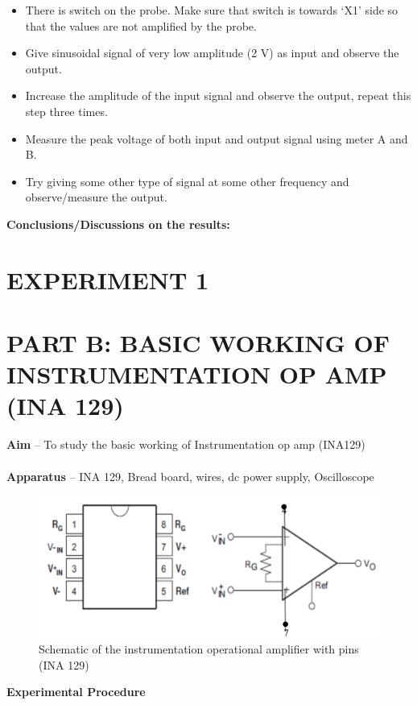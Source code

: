 \documentclass[9pt]{scrreprt}
\begin{document}
\begin{itemize}
\item There is switch on the probe. Make sure that switch is towards ‘X1’ side so that the values are not amplified by the probe.
\item Give sinusoidal signal of very low amplitude (2 V) as input and observe the output.
\item Increase the amplitude of the input signal and observe the output, repeat this step three times.
\item Measure the peak voltage of both input and output signal using meter A and B.
\item Try giving some other type of signal at some other frequency and observe/measure the output.
\end{itemize}

\textbf{Conclusions/Discussions on the results:}
\newpage
\section*{\centering EXPERIMENT 1}
\section*{\normalsize PART B: BASIC WORKING OF INSTRUMENTATION OP AMP (INA 129)}
\textbf{Aim} – To study the basic working of Instrumentation op amp (INA129)\\
\\
\textbf{Apparatus} – INA 129, Bread board, wires, dc power supply, Oscilloscope\\
\begin{figure}[H]
	\centering
	\includegraphics[width=0.8\linewidth]{logos/OP-Amp.PNG}
	\caption{Schematic of the instrumentation operational amplifier with pins (INA 129)}
	\label{fig:OP-Amp}
\end{figure}

\textbf{Experimental Procedure}
\end{document}

